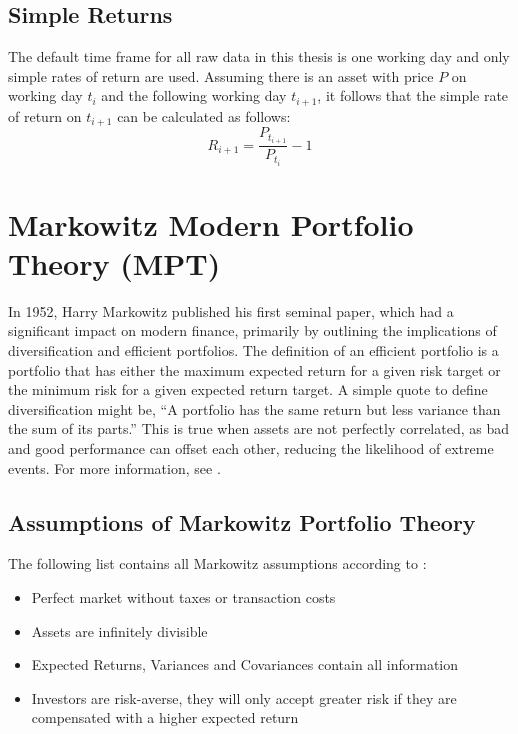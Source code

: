 \documentclass[
  oneside]{book}
\providecommand{\tightlist}{%
  \setlength{\itemsep}{0pt}\setlength{\parskip}{0pt}}
\begin{document}
\hypertarget{simple-returns}{%
\subsection{Simple Returns}\label{simple-returns}}

The default time frame for all raw data in this thesis is one working day and only simple rates of return are used. Assuming there is an asset with price \(P\) on working day \(t_i\) and the following working day \(t_{i+1}\), it follows that the simple rate of return on \(t_{i+1}\) can be calculated as follows:
\[
  R_{i+1} = \frac{P_{t_{i+1}}}{P_{t_i}}-1
\]

\hypertarget{markowitz-modern-portfolio-theory-mpt}{%
\section{Markowitz Modern Portfolio Theory (MPT)}\label{markowitz-modern-portfolio-theory-mpt}}

In 1952, Harry Markowitz published his first seminal paper, which had a significant impact on modern finance, primarily by outlining the implications of diversification and efficient portfolios. The definition of an efficient portfolio is a portfolio that has either the maximum expected return for a given risk target or the minimum risk for a given expected return target. A simple quote to define diversification might be, ``A portfolio has the same return but less variance than the sum of its parts.'' This is true when assets are not perfectly correlated, as bad and good performance can offset each other, reducing the likelihood of extreme events. For more information, see \citep{Mari2005}.

\hypertarget{assumptions-of-markowitz-portfolio-theory}{%
\subsection{Assumptions of Markowitz Portfolio Theory}\label{assumptions-of-markowitz-portfolio-theory}}

The following list contains all Markowitz assumptions according to \citep{Mari2005}:

\vspace{-0.4cm}

\begin{itemize}
\tightlist
\item
  Perfect market without taxes or transaction costs
\item
  Assets are infinitely divisible
\item
  Expected Returns, Variances and Covariances contain all information
\item
  Investors are risk-averse, they will only accept greater risk if they
  are compensated with a higher expected return
\end{itemize}
\end{document}

